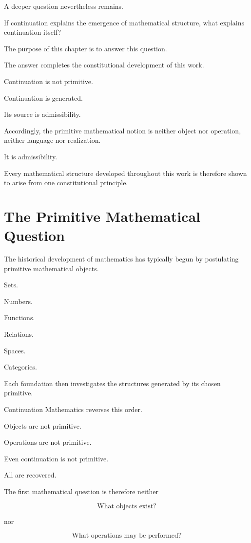\documentclass[13pt,openany]{book}
\theoremstyle{plain}
\theoremstyle{definition}
\begin{document}
A deeper question nevertheless remains.

If continuation explains the emergence of mathematical structure, what explains
continuation itself?

The purpose of this chapter is to answer this question.

The answer completes the constitutional development of this work.

Continuation is not primitive.

Continuation is generated.

Its source is admissibility.

Accordingly, the primitive mathematical notion is neither object nor operation,
neither language nor realization.

It is admissibility.

Every mathematical structure developed throughout this work is therefore shown
to arise from one constitutional principle.

\section{The Primitive Mathematical Question}

The historical development of mathematics has typically begun by postulating
primitive mathematical objects.

Sets.

Numbers.

Functions.

Relations.

Spaces.

Categories.

Each foundation then investigates the structures generated by its chosen
primitive.

Continuation Mathematics reverses this order.

Objects are not primitive.

Operations are not primitive.

Even continuation is not primitive.

All are recovered.

The first mathematical question is therefore neither

\[
\text{What objects exist?}
\]

nor

\[
\text{What operations may be performed?}
\]
\end{document}
